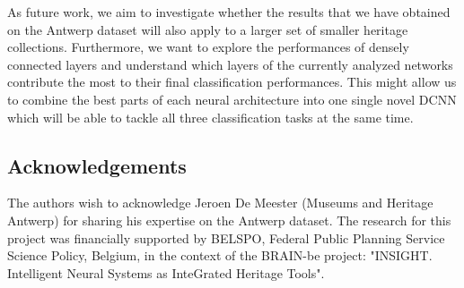 \documentclass[runningheads]{llncs}
\begin{document}
As future work, we aim to investigate whether the results that we have obtained on the Antwerp dataset will also apply to a larger set of smaller heritage collections. Furthermore, we want to explore the performances of densely connected layers \cite{huang2017densely} and understand which layers of the currently analyzed networks contribute the most to their final classification performances. This might allow us to combine the best parts of each neural architecture into one single novel DCNN which will be able to tackle all three classification tasks at the same time. 

\subsection*{Acknowledgements}
The authors wish to acknowledge Jeroen De Meester (Museums and Heritage Antwerp) for sharing his expertise on the Antwerp dataset. The research for this project was financially supported by BELSPO, Federal Public Planning Service Science Policy, Belgium, in the context of the BRAIN-be project: "INSIGHT. Intelligent Neural Systems as InteGrated Heritage Tools".

%
%
%
%
%
%


%





\end{document}
